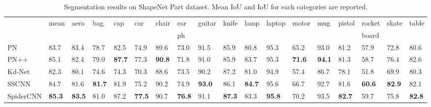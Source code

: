 \documentclass[runningheads]{llncs}
\begin{document}
\begin{table}
\begin{center}
\caption{Segmentation results on ShapeNet Part dataset. Mean IoU and IoU for each categories are reported.}
\label{table:scanseg}
\begin{tabular}{l | l | llllllllllllllll}
\hline\noalign{\smallskip}
   & {\tiny mean}  & {\tiny aero}  & {\tiny bag} & {\tiny cap} & {\tiny car} & {\tiny chair} & {\tiny ear} & {\tiny guitar} & {\tiny knife} & {\tiny lamp} & {\tiny laptop} & {\tiny motor} & {\tiny mug} & {\tiny pistol} & {\tiny rocket} & {\tiny skate}  & {\tiny table}   
\\
  &         &  &      &         &        &  &    {\tiny ph}         &         &         &             &  &         &            &            & {\tiny board} &       
 \\
\noalign{\smallskip}
\hline
\noalign{\smallskip}
{\tiny PN \cite{qi2017pointnet}}  & {\tiny 83.7}  & {\tiny 83.4}  & {\tiny 78.7} & {\tiny 82.5} & {\tiny 74.9} & {\tiny 89.6} & {\tiny 73.0} & {\tiny 91.5} & {\tiny 85.9} & {\tiny 80.8} & {\tiny 95.3} & {\tiny65.2} & {\tiny 93.0} & {\tiny 81.2} & {\tiny 57.9} & {\tiny 72.8}  & {\tiny 80.6}    
\\
{\tiny PN++\cite{qi2017pointnet++}}& {\tiny 85.1}  & {\tiny 82.4}  & {\tiny 79.0} & {\bf \tiny 87.7} & {\tiny 77.3} & {\bf \tiny 90.8} & {\tiny 71.8} & {\tiny 91.0} & {\tiny 85.9} & {\tiny 83.7} & {\tiny 95.3} & {\bf \tiny 71.6} & {\bf \tiny 94.1} & {\tiny 81.3} & {\tiny 58.7} & {\tiny 76.4}  & {\tiny 82.6}  
\\
{\tiny Kd-Net \cite{klokov2017escape}}  & {\tiny 82.3}  & {\tiny80.1}  & {\tiny 74.6} & {\tiny 74.3} & {\tiny 70.3} & {\tiny 88.6} & {\tiny 73.5} & {\tiny 90.2} & {\tiny 87.2} & {\tiny 81.0} & {\tiny94.9} & {\tiny 57.4} & {\tiny 86.7} & {\tiny 78.1} & {\tiny 51.8} & {\tiny 69.9}  & {\tiny 80.3}       
\\
{\tiny SSCNN \cite{yi2017syncspeccnn}}  & {\tiny 84.7}  & {\tiny 81.6}  & {\bf \tiny 81.7} & {\tiny 81.9} & {\tiny 75.2} & {\tiny 90.2} & {\tiny 74.9} & {\bf \tiny 93.0} & {\tiny 86.1} & {\bf \tiny 84.7} & {\tiny 95.6} & {\tiny 66.7} & {\tiny 92.7} & {\tiny 81.6} & {\bf \tiny 60.6} & {\bf \tiny 82.9}  & {\tiny 82.1}      
\\
\hline
{\tiny SpiderCNN}  & {\bf \tiny 85.3}  & {\bf \tiny83.5}  & {\tiny 81.0} & {\tiny 87.2} & {\bf \tiny 77.5} & {\tiny 90.7} & {\bf \tiny 76.8} & {\tiny 91.1} & {\bf \tiny 87.3} & {\tiny 83.3} & {\bf \tiny 95.8} & {\tiny 70.2} & {\tiny 93.5} & {\bf \tiny 82.7} & {\tiny 59.7} & {\tiny 75.8}  & {\bf \tiny82.8}     
\\
\hline
\end{tabular}
\end{center}
\end{table}
\end{document}
